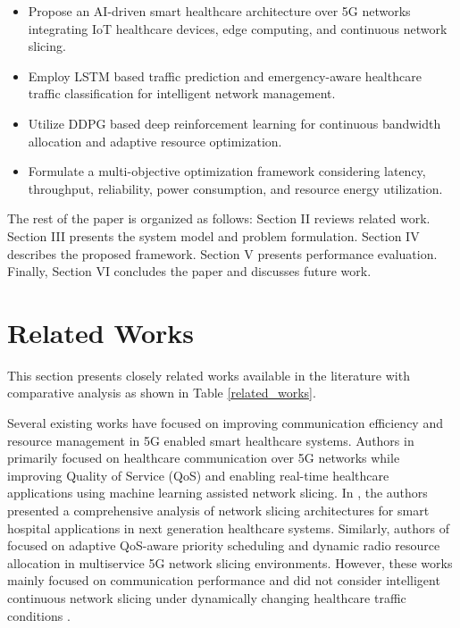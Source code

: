 \documentclass[10pt,journal,compsoc]{IEEEtran}
\begin{document}
\begin{itemize}

\item Propose an AI-driven smart healthcare architecture over 5G networks integrating IoT healthcare devices, edge computing, and continuous network slicing.

\item Employ LSTM based traffic prediction and emergency-aware healthcare traffic classification for intelligent network management.

\item Utilize DDPG based deep reinforcement learning for continuous bandwidth allocation and adaptive resource optimization.

\item Formulate a multi-objective optimization framework considering latency, throughput, reliability, power consumption, and resource energy utilization.

\end{itemize}

The rest of the paper is organized as follows: Section II reviews related work. Section III presents the system model and problem formulation. Section IV describes the proposed framework. Section V presents performance evaluation. Finally, Section VI concludes the paper and discusses future work.







\section{Related Works}\label{SecII}

This section presents closely related works available in the literature with comparative analysis as shown in Table \ref{related_works}.

Several existing works have focused on improving communication efficiency and resource management in 5G enabled smart healthcare systems. Authors in \cite{basu2022softhealth} primarily focused on healthcare communication over 5G networks while improving Quality of Service (QoS) and enabling real-time healthcare applications using machine learning assisted network slicing. In \cite{wijethilaka2022hospital}, the authors presented a comprehensive analysis of network slicing architectures for smart hospital applications in next generation healthcare systems. Similarly, authors of \cite{yaqoob2026aqps} focused on adaptive QoS-aware priority scheduling and dynamic radio resource allocation in multiservice 5G network slicing environments. However, these works mainly focused on communication performance and did not consider intelligent continuous network slicing under dynamically changing healthcare traffic conditions \cite{gollavilli2024healthcare}.
\end{document}
